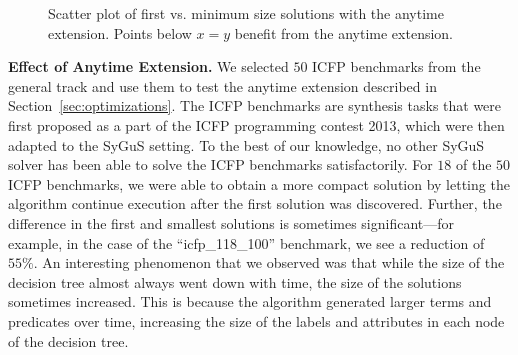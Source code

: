 \documentclass{llncs}
\newcommand{\sygus}{{\sffamily\fontsize{8.5}{10}\selectfont
    SyGuS}\xspace}
\renewcommand{\paragraph}[1]{\par\noindent\textbf{#1.}}
\begin{document}
\begin{wrapfigure}{r}{0.3\textwidth}%
\centering
  \caption{Scatter plot of first vs. minimum size
    solutions with the anytime extension. Points below $x = y$
    benefit from the anytime extension.}
    \label{fig:anytime_results}
\vspace*{-2ex}
\end{wrapfigure}
\paragraph{Effect of Anytime Extension}
We selected $50$ ICFP benchmarks from the general track and use them
to test the anytime extension described in
Section~\ref{sec:optimizations}.
The ICFP benchmarks are synthesis tasks that were first proposed as a
part of the ICFP programming contest 2013, which were then adapted to
the \sygus setting.
To the best of our knowledge, no other \sygus solver has been able to
solve the ICFP benchmarks satisfactorily.
For $18$ of the $50$ ICFP benchmarks, we were able to obtain a more
compact solution by letting the algorithm continue execution after the
first solution was discovered.
Further, the difference in the first and
smallest solutions is sometimes significant---for example, in the
case of the ``icfp\_118\_100'' benchmark, we see a reduction of $55\%$.
An interesting phenomenon that we observed was that while the size of
the decision tree almost always went down with time, the size of the
solutions sometimes increased.
This is because the algorithm generated larger terms and predicates
over time, increasing the size of the labels and attributes in each node
of the decision tree.
\end{document}
